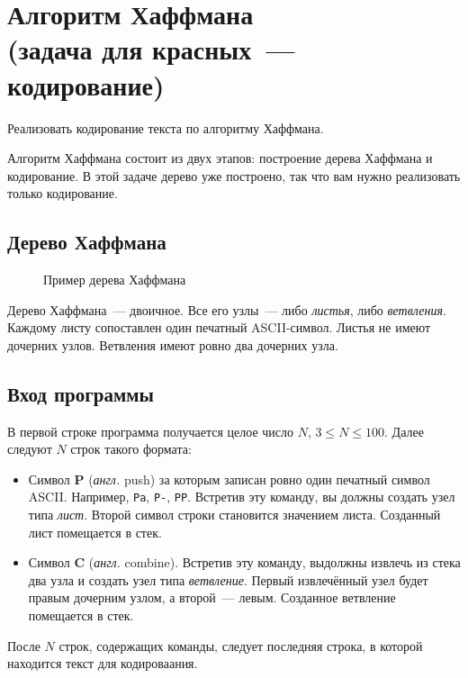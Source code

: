 ﻿\documentclass[a4paper,10pt]{article}
\begin{document}
\section*{Алгоритм Хаффмана\\
(задача для красных~--- кодирование)}

Реализовать кодирование текста по алгоритму Хаффмана.

Алгоритм Хаффмана состоит из двух этапов: построение дерева Хаффмана и кодирование.
В этой задаче дерево уже построено, так что вам нужно реализовать только кодирование.

\subsection*{Дерево Хаффмана}

\begin{figure}[htbp]
    \centering
    
    \caption{Пример дерева Хаффмана}
\end{figure}

Дерево Хаффмана~--- двоичное.
Все его узлы~--- либо \textit{листья}, либо \textit{ветвления}.
Каждому листу сопоставлен один печатный ASCII-символ.
Листья не имеют дочерних узлов.
Ветвления имеют ровно два дочерних узла.

\subsection*{Вход программы}

В первой строке программа получается целое число $N$, $3 \leq N \leq 100$.
Далее следуют $N$ строк такого формата:

\begin{itemize}
    \item Символ \textbf{P} (\textit{англ.} push) за которым записан ровно один печатный символ ASCII. Например, \texttt{Pa}, \texttt{P-}, \texttt{PP}.
    Встретив эту команду, вы должны создать узел типа \textit{лист}.
    Второй символ строки становится значением листа.
    Созданный лист помещается в стек.
    \item Символ \textbf{C} (\textit{англ.} combine).
    Встретив эту команду, выдолжны извлечь из стека два узла и создать узел типа \textit{ветвление}.
    Первый извлечённый узел будет правым дочерним узлом, а второй~--- левым.
    Созданное ветвление помещается в стек.
\end{itemize}

После $N$ строк, содержащих команды, следует последняя строка, в которой находится текст для кодироваания.
\end{document}
